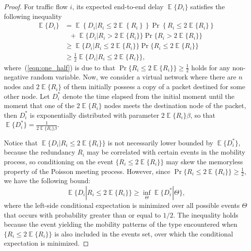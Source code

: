 \documentclass[twocolumn, 10pt]{svjour3}         \smartqed  \usepackage{graphicx}
\DeclareMathOperator*{\E}{\mathbb{E}}
\begin{document}
\begin{proof}
For traffic flow $i$, its expected end-to-end delay $\E\{D_i\}$ satisfies the following inequality
\begin{align}
	\E\{D_i\} &= \E  \left\{ D_i | R_i \leq 2 \E  \left\{ R_i \right \} \right\} \Pr \left \{R_i \leq 2 \E\{R_i\}   \right \} \nonumber\\
	&~~~+\E \{D_i | R_i > 2 \E\{R_i\} \} \Pr \{R_i > 2 \E\{R_i\}  \} \nonumber\\
	&\geq \E \{D_i | R_i \leq 2 \E\{R_i\} \} \Pr \{R_i \leq 2 \E\{R_i\}  \} \nonumber\\
	&\geq  \frac{1}{2} \E \{D_i | R_i \leq 2 \E\{R_i\} \},\label{eqn:one_half}
\end{align}
where~(\ref{eqn:one_half}) is due to that $\Pr \{R_i \leq 2 \E\{R_i\}  \} \geq  \frac{1}{2}$ holds for any non-negative random variable.
Now, we consider a virtual network where there are $n$ nodes and $ 2 \E\{R_i\} $ of them initially possess a copy of a packet destined for some other node. 
Let  $D_i^*$ denote the time elapsed from the initial moment until the  moment that one of the $ 2 \E\{R_i\} $ nodes  meets the destination node of the packet,
then  $D_i^*$ is exponentially distributed with parameter $2 \E\{R_i\} \beta$, so that  $\E\{D_i^*\} = \frac{1}{2 \E\{R_i\} \beta}$.

Notice that $\E \{D_i | R_i \leq 2 \E\{R_i\} \}$ is not necessarily lower bounded by $\E\{D_i^*\}$, because the redundancy  $R_i$ may be correlated with certain events in the mobility process, so conditioning on the event $\{R_i \leq 2 \E\{R_i\} \}$ may skew the memoryless property of the Poisson meeting process. However, since $\Pr \{R_i \leq 2 \E\{R_i\}  \} \geq  \frac{1}{2}$, we have the following bound:
\begin{equation}\label{eqn:mini_ineq}
	\E \{D_i | R_i \leq 2 \E\{R_i\} \} \geq \underset{\Theta}{\inf}  \E\{D_i^* | \Theta \},
\end{equation}
where the left-side conditional expectation is minimized over all possible events $\Theta$ that occurs with probability greater than or equal to $1/2$. 
The inequality holds because the event yielding the mobility patterns of the type encountered when $\{R_i \leq 2 \E\{R_i\} \}$ is also included in the events set, over which the conditional expectation is minimized.



\end{proof}
\end{document}
